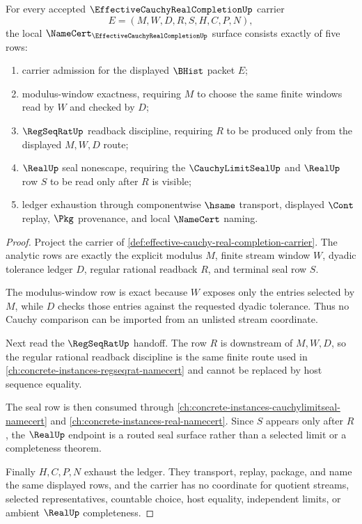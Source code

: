 \begin{theorem}
\label{thm:effective-cauchy-real-completion-obligation-surface}
For every accepted $\EffectiveCauchyRealCompletionUp$ carrier
$$
E=(M,W,D,R,S,H,C,P,N),
$$
the local $\NameCert_{\EffectiveCauchyRealCompletionUp}$ surface consists
exactly of five rows:
\begin{enumerate}
\item carrier admission for the displayed $\BHist$ packet $E$;
\item modulus-window exactness, requiring $M$ to choose the same finite windows read by $W$ and checked by $D$;
\item $\RegSeqRatUp$ readback discipline, requiring $R$ to be produced only from the displayed $M,W,D$ route;
\item $\RealUp$ seal nonescape, requiring the $\CauchyLimitSealUp$ and $\RealUp$ row $S$ to be read only after $R$ is visible;
\item ledger exhaustion through componentwise $\hsame$ transport, displayed $\Cont$ replay, $\Pkg$ provenance, and local $\NameCert$ naming.
\end{enumerate}
\end{theorem}
\begin{proof}
Project the carrier of \autoref{def:effective-cauchy-real-completion-carrier}. The analytic rows are exactly the explicit modulus $M$, finite stream window $W$, dyadic tolerance ledger $D$, regular rational readback $R$, and terminal seal row $S$.

The modulus-window row is exact because $W$ exposes only the entries selected by $M$, while $D$ checks those entries against the requested dyadic tolerance. Thus no Cauchy comparison can be imported from an unlisted stream coordinate.

Next read the $\RegSeqRatUp$ handoff. The row $R$ is downstream of $M,W,D$, so the regular rational readback discipline is the same finite route used in \autoref{ch:concrete-instances-regseqrat-namecert} and cannot be replaced by host sequence equality.

The seal row is then consumed through \autoref{ch:concrete-instances-cauchylimitseal-namecert} and \autoref{ch:concrete-instances-real-namecert}. Since $S$ appears only after $R$, the $\RealUp$ endpoint is a routed seal surface rather than a selected limit or a completeness theorem.

Finally $H,C,P,N$ exhaust the ledger. They transport, replay, package, and name the same displayed rows, and the carrier has no coordinate for quotient streams, selected representatives, countable choice, host equality, independent limits, or ambient $\RealUp$ completeness.
\end{proof}

